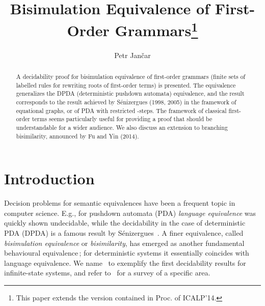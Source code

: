 \documentclass{llncs}
\begin{document}
\mainmatter  

\thispagestyle{plain}
\pagestyle{plain}

\title{Bisimulation Equivalence of
		First-Order Grammars\thanks{This paper extends the version
	contained in Proc. of ICALP'14.}}

	\author{Petr Jan\v{c}ar}




\maketitle

\begin{abstract}
A decidability proof for bisimulation equivalence 
of first-order grammars
(finite sets
of labelled rules for rewriting roots of first-order terms) is
presented. The equivalence generalizes the  
DPDA
(deterministic pushdown automata) equivalence, and the result corresponds
to the result achieved by  S\'enizergues (1998, 2005) in the framework of
equational graphs, or of 
PDA with
restricted -steps. The framework
of classical first-order terms seems particularly useful for 
providing a 
proof that should be understandable for a wider audience.
We also discuss an extension to branching bisimilarity,
announced by Fu and Yin (2014).
\end{abstract}

\section{Introduction}\label{sec:intro}


Decision problems for  semantic equivalences 
have been a frequent topic in computer science. 
E.g.,
for pushdown automata (PDA) 
\emph{language equivalence} was quickly shown undecidable,
while 
the decidability in the case of deterministic PDA (DPDA) 
is 
a famous result 
by S\'enizergues~\cite{Senizergues:TCS2001}.
A finer equivalence, called \emph{bisimulation equivalence} or
\emph{bisimilarity}, has emerged as another fundamental behavioural
equivalence\,; for deterministic systems it essentially coincides with
language equivalence.
We name~\cite{BBK2} to exemplify the 
first decidability results for infinite-state systems,
and 
refer to~\cite{Srba:Roadmap:04} for a survey of a specific area.
\end{document}
